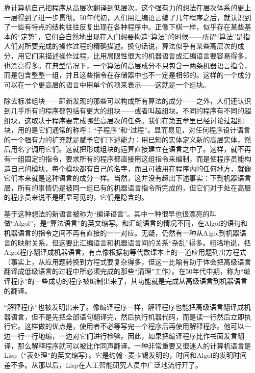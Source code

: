 靠计算机自己把程序从高层次翻译到低层次，这个强有力的想法在层次体系的更上一层得到了进一步贯彻。50年代初，人们用汇编语言编了几年程序之后，就认识到了一些有特点的结构往往反复出现在各种程序中。正像下棋一样，似乎存在某些基本的“定势”，它们会自然地出现在人们想要构造“算法”的时候——所谓“算法”是指人们对所要完成的操作过程的精确描述。换句话说，算法似乎有某些高层次的成分，用它们来描述操作过程，比用局限性很大的机器语言或汇编语言要容易得多，也漂亮得多。在典型情况下，一个算法的高层成分不只包含一两条机器语言指令，而是包含整整一组，并且这些指令在存储器中也不一定是相邻的。这样的一个成分可以在一个更高层的语言中用单个的项来表示——这就是一个组块。

除去标准组块——即新发现的那些可以构成所有算法的成分——之外，人们还认识到几乎所有的程序都包括有更大的组块——或者叫超组块。不同的程序有不同的超组块，这取决于程序要完成哪些高层次的任务。我们在第五章里已经讨论过超组块，用的是它们通常的称呼：“子程序”和“过程”。显而易见，对任何程序设计语言的一个强有力的扩充就是赋予它们下述能力：用已知的实体定义新的高层实体，然后用名字调用它们。这就把形成组块的运算直接建立在语言之中了。这样，就不再有一组固定的指令，要求所有的程序都直接用这组指令来编制，而是使程序员能构造自己的模块，每个模块都有自己的名字，而且可被用在程序内的任何地方，就像它们本来就是这种语言的成分一样。当然，这并没有超出下述事实：下到机器语言层，所有的事情仍是被同一组已有的机器语言指令所完成的，但它们对于处在高层的程序员来说不是明显可见的，它们是隐含的。

基于这种想法的新语言被称为“编译语言”。其中一种很早也很漂亮的叫做“Algol”，是“算法语言”的英文缩写。和汇编语言的情况不同，在Algol的语句和机器语言的指令之间不再有直接的一一对应。无疑，仍然有一种从Algol到机器语言的映射关系，但这要比汇编语言和机器语言间的关系“杂乱”得多。粗略地说，把Algol程序翻译成机器语言，有点像根据初等代数课本上的一道应用题列出方程式（事实上，从应用题转换到方程式要复杂得多，但这一比喻有助于体会把高级语言翻译成低级语言的过程中所必须完成的那些“清理”工作）。在50年代中期，称为“编译程序”的一些成功的程序被编制出来了，其功能就是完成从高级语言到机器语言的翻译。

“解释程序”也被发明出来了。像编译程序一样，解释程序也能把高级语言翻译成机器语言，但不是先把全部语句翻译完，然后执行机器代码，而是读一行然后立即执行它。这样做的优点是，使用者不必等写完一个程序后再使用解释程序。他可以一边一行一行地编，一边对它们进行检验。因此，如果把编译程序比作书面发言翻译，那么解释程序就可以被比作同声翻译。一种非常重要又很迷人的计算机语言是Lisp（“表处理”的英文缩写）。它是约翰·麦卡锡发明的，时间和Algol的发明时间差不多。从那以后，Lisp在人工智能研究人员中广泛地流行开了。

